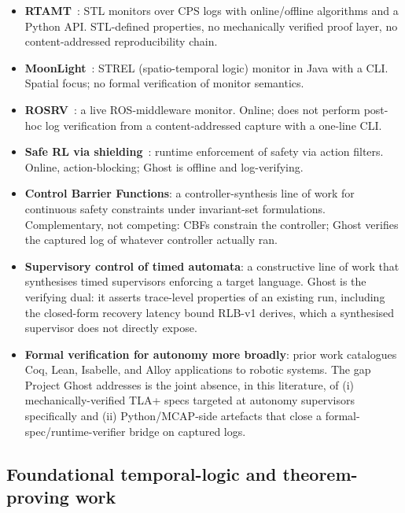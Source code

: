 \documentclass[acmsmall,nonacm=true,review=false]{acmart}
\theoremstyle{plain}
\begin{document}
\begin{itemize}
  \item \textbf{RTAMT}~\cite{nikovic2020rtamt,nikovic2023rtamt}: STL
        monitors over CPS logs with online/offline algorithms and a
        Python API. STL-defined properties, no mechanically verified
        proof layer, no content-addressed reproducibility chain.
  \item
        \textbf{MoonLight}~\cite{bartocci2020moonlight,bartocci2023moonlight}:
        STREL (spatio-temporal logic) monitor in Java with a CLI.
        Spatial focus; no formal verification of monitor semantics.
  \item \textbf{ROSRV}~\cite{huang2014rosrv}: a live ROS-middleware
        monitor. Online; does not perform post-hoc log verification
        from a content-addressed capture with a one-line CLI.
  \item \textbf{Safe RL via
        shielding}~\cite{alshiekh2018safe,carr2023safe}:
        runtime enforcement of safety via action filters. Online,
        action-blocking; Ghost is offline and log-verifying.
  \item \textbf{Control Barrier Functions}: a controller-synthesis
        line of work for continuous safety constraints under
        invariant-set formulations. Complementary, not competing:
        CBFs constrain the controller; Ghost verifies the captured
        log of whatever controller actually ran.
  \item \textbf{Supervisory control of timed automata}: a
        constructive line of work that synthesises timed
        supervisors enforcing a target language. Ghost is the
        verifying dual: it asserts trace-level properties of an
        existing run, including the closed-form recovery latency
        bound RLB-v1 derives, which a synthesised supervisor does
        not directly expose.
  \item \textbf{Formal verification for autonomy more broadly}:
        prior work catalogues Coq, Lean, Isabelle, and Alloy
        applications to robotic systems. The gap Project Ghost
        addresses is the joint absence, in this literature, of
        (i) mechanically-verified TLA+ specs targeted at autonomy
        supervisors specifically and (ii) Python/MCAP-side
        artefacts that close a formal-spec/runtime-verifier bridge
        on captured logs.
\end{itemize}

\subsection{Foundational temporal-logic and theorem-proving work}
\end{document}
